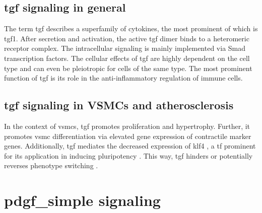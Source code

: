     \subsection{\ac{tgf} signaling in general}
    \label{subsec:tgf_the_cytokine}
    The term \acf{tgf} describes a superfamily of cytokines, the most prominent of which is \ac{tgf}1. After secretion and activation, the active \ac{tgf} dimer binds to a heteromeric receptor complex. The intracellular signaling is mainly implemented via Smad transcription factors. The cellular effects of \ac{tgf} are highly dependent on the cell type and can even be pleiotropic for cells of the same type. The most prominent function of \ac{tgf} is its role in the anti-inflammatory regulation of immune cells. \cite{goumansTGFbetaSignalingControl2018, batlleTransformingGrowthFactorbeta2019}

    \subsection{\ac{tgf} signaling in VSMCs and atherosclerosis}
    \label{subsec:pdf_signaling}
    In the context of \acp{vsmc}, \ac{tgf} promotes proliferation and hypertrophy. Further, it promotes \ac{vsmc} differentiation via elevated gene expression of contractile marker genes. Additionally, \ac{tgf} mediates the decreased expression of \ac{klf4} \cite{davis-dusenberyDownregulationKruppellikeFactor42011}, a \ac{tf} prominent for its application in inducing pluripotency \cite{takahashiInductionPluripotentStem2007}. This way, \ac{tgf} hinders \cite{davis-dusenberyDownregulationKruppellikeFactor42011} or potentially reverses phenotype switching \cite{panSingleCellGenomicsReveals2020}.

\section{\acs{pdgf_simple} signaling}
\label{sec:pdgf}
